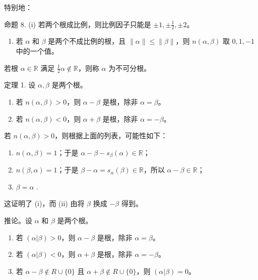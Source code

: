 特别地：

命题 8. (i) 若两个根成比例，则比例因子只能是 \(\pm 1, \pm \frac{1}{2}, \pm 2\)。

\begin{enumerate}
\def\labelenumi{(\roman{enumi})}
\setcounter{enumi}{1}
\tightlist
\item
  若 \(\alpha\) 和 \(\beta\) 是两个不成比例的根，且 \(\| \alpha \| \leqslant \| \beta \|\)，则 \(n(\alpha, \beta)\) 取 \(0, 1, -1\) 中的一个值。
\end{enumerate}

若根 \(\alpha \in \mathbb{R}\) 满足 \(\frac{1}{2}\alpha \notin \mathbb{R}\)，则称 \(\alpha\) 为不可分根。

定理 1. 设 \(\alpha, \beta\) 是两个根。

\begin{enumerate}
\def\labelenumi{(\roman{enumi})}
\item
  若 \(n(\alpha, \beta) > 0\)，则 \(\alpha - \beta\) 是根，除非 \(\alpha = \beta\)。
\item
  若 \(n(\alpha, \beta) < 0\)，则 \(\alpha + \beta\) 是根，除非 \(\alpha = -\beta\)。
\end{enumerate}

若 \(n(\alpha, \beta) > 0\)，则根据上面的列表，可能性如下：

\begin{enumerate}
\def\labelenumi{\arabic{enumi})}
\item
  \(n(\alpha, \beta) = 1\)；于是 \(\alpha - \beta - s_{\beta}(\alpha) \in \mathbb{R}\)；
\item
  \(n(\beta, \alpha) = 1\)；于是 \(\beta - \alpha = s_{\alpha}(\beta) \in \mathbb{R}\)，所以 \(\alpha - \beta \in \mathbb{R}\)；
\item
  \(\beta = \alpha\) .
\end{enumerate}

这证明了 (i)，而 (ii) 由将 \(\beta\) 换成 \(-\beta\) 得到。

推论。设 \(\alpha\) 和 \(\beta\) 是两个根。

\begin{enumerate}
\def\labelenumi{(\roman{enumi})}
\item
  若 \((\alpha |\beta) > 0\)，则 \(\alpha - \beta\) 是根，除非 \(\alpha = \beta\)。
\item
  若 \((\alpha |\beta) < 0\)，则 \(\alpha + \beta\) 是根，除非 \(\alpha = -\beta\)。
\item
  若 \(\alpha - \beta \notin R \cup \{0\}\) 且 \(\alpha + \beta \notin R \cup \{0\}\)，则 \((\alpha | \beta) = 0\)。
\end{enumerate}

